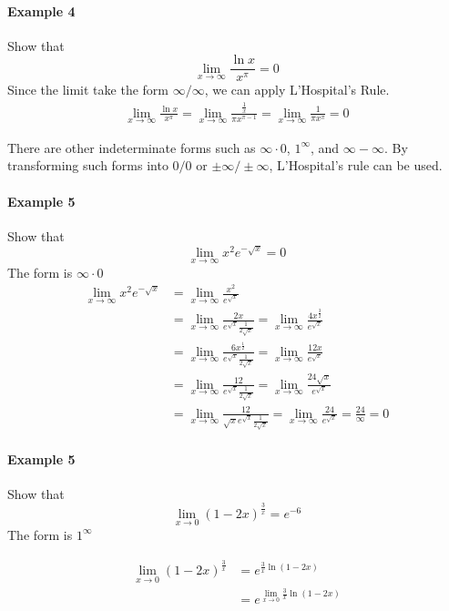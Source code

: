 \documentclass[12pt]{article}
\begin{document}
\paragraph{Example 4} Show that
\[
    \lim_{x \to \infty} \frac{\ln x}{x^\pi} = 0 
\]
Since the limit take the form $\infty/\infty$, we can apply L'Hospital's Rule.
\begin{align*} 
    \lim_{x \to \infty} \frac{\ln x}{x^\pi} = \lim_{x \to \infty} \frac{\frac{1}{x}}{\pi x^{\pi - 1}} =  \lim_{x \to \infty} \frac{1}{\pi x^\pi} = 0
\end{align*}

There are other indeterminate forms such as $\infty \cdot 0$, $1^{\infty}$, and $\infty - \infty$. By transforming such forms into
$0/0$ or $\pm \infty / \pm \infty$, L'Hospital's rule can be used.
\paragraph{Example 5} Show that
\[
    \lim_{x \to \infty} x^2 e^{ - \sqrt{x}} = 0
\]
The form is $\infty \cdot 0$
\begin{align*} 
    \lim_{x \to \infty} x^2 e^{ - \sqrt{x}} &= \lim_{x \to \infty} \frac{x^2}{e^{\sqrt{x}}} \\
    &= \lim_{x \to \infty} \frac{2x}{e^{\sqrt{x}} \frac{1}{2 \sqrt{x}}} = \lim_{x\to \infty} \frac{4x^{\frac{3}{2}}}{e^{\sqrt{x}}} \\
    &= \lim_{x \to \infty} \frac{6x^{\frac{1}{2}}}{e^{\sqrt{x}} \frac{1}{2 \sqrt{x}}} = \lim_{x \to \infty} \frac{12x}{e^{\sqrt{x}}} \\
    &= \lim_{x \to \infty} \frac{12}{e^{\sqrt{x}} \frac{1}{2 \sqrt{x}}} = \lim_{x \to \infty} \frac{24 \sqrt{x}}{e^{\sqrt{x}}} \\
    &= \lim_{x \to \infty} \frac{12}{\sqrt{x} e^{\sqrt{x}} \frac{1}{2 \sqrt{x}}} = \lim_{x \to \infty} \frac{24}{e^{\sqrt{x}}} = \frac{24}{\infty} = 0 
\end{align*}
\paragraph{Example 5} Show that
\[
    \lim_{x \to 0} (1 - 2x)^{\frac{3}{x}} = e^{- 6}
\]
The form is $1^{\infty}$

\begin{align*} 
    \lim_{x \to 0} (1 - 2x)^{\frac{3}{x}} &= e^{\frac{3}{x} \ln(1 -2x)} \\
    &= e^{\lim_{x \to 0} \frac{3}{x} \ln(1 - 2x)} \\
\end{align*}
\end{document}
